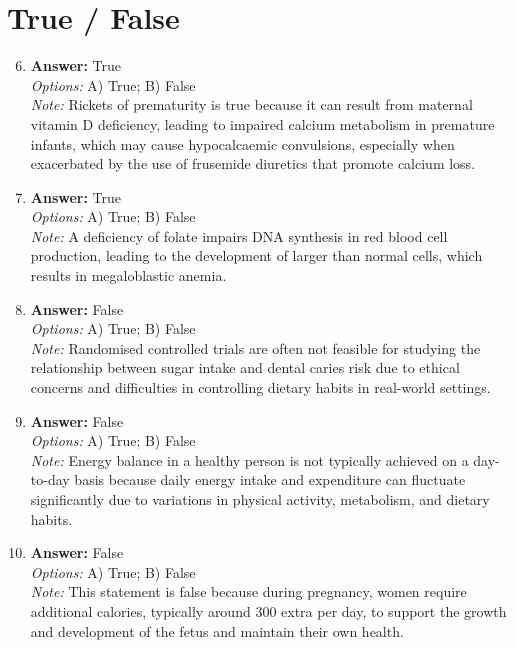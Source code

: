 \documentclass[12pt]{article}
\begin{document}
\section*{True / False}
\begin{enumerate}[label=\arabic*.]
\setcounter{enumi}{5}
\item \textbf{Answer:} True
\\ \textit{Options:} A) True; B) False
\\ \textit{Note:} Rickets of prematurity is true because it can result from maternal vitamin D deficiency, leading to impaired calcium metabolism in premature infants, which may cause hypocalcaemic convulsions, especially when exacerbated by the use of frusemide diuretics that promote calcium loss.
\item \textbf{Answer:} True
\\ \textit{Options:} A) True; B) False
\\ \textit{Note:} A deficiency of folate impairs DNA synthesis in red blood cell production, leading to the development of larger than normal cells, which results in megaloblastic anemia.
\item \textbf{Answer:} False
\\ \textit{Options:} A) True; B) False
\\ \textit{Note:} Randomised controlled trials are often not feasible for studying the relationship between sugar intake and dental caries risk due to ethical concerns and difficulties in controlling dietary habits in real-world settings.
\item \textbf{Answer:} False
\\ \textit{Options:} A) True; B) False
\\ \textit{Note:} Energy balance in a healthy person is not typically achieved on a day-to-day basis because daily energy intake and expenditure can fluctuate significantly due to variations in physical activity, metabolism, and dietary habits.
\item \textbf{Answer:} False
\\ \textit{Options:} A) True; B) False
\\ \textit{Note:} This statement is false because during pregnancy, women require additional calories, typically around 300 extra per day, to support the growth and development of the fetus and maintain their own health.
\end{enumerate}
\end{document}
